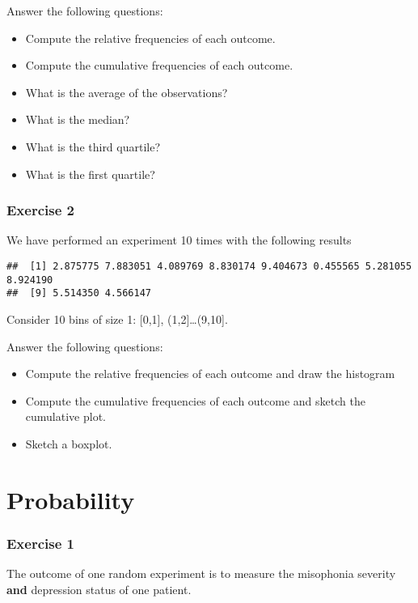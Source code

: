 \documentclass[
]{book}
\providecommand{\tightlist}{%
  \setlength{\itemsep}{0pt}\setlength{\parskip}{0pt}}
\begin{document}
Answer the following questions:

\begin{itemize}
\tightlist
\item
  Compute the relative frequencies of each outcome.
\item
  Compute the cumulative frequencies of each outcome.
\item
  What is the average of the observations?
\item
  What is the median?
\item
  What is the third quartile?
\item
  What is the first quartile?
\end{itemize}

\hypertarget{exercise-2}{%
\subsubsection{Exercise 2}\label{exercise-2}}

We have performed an experiment 10 times with the following results

\begin{verbatim}
##  [1] 2.875775 7.883051 4.089769 8.830174 9.404673 0.455565 5.281055 8.924190
##  [9] 5.514350 4.566147
\end{verbatim}

Consider 10 bins of size 1: {[}0,1{]}, (1,2{]}\ldots(9,10{]}.

Answer the following questions:

\begin{itemize}
\item
  Compute the relative frequencies of each outcome and draw the histogram
\item
  Compute the cumulative frequencies of each outcome and sketch the cumulative plot.
\item
  Sketch a boxplot.
\end{itemize}

\hypertarget{probability-3}{%
\section{Probability}\label{probability-3}}

\hypertarget{exercise-1-1}{%
\subsubsection{Exercise 1}\label{exercise-1-1}}

The outcome of one random experiment is to measure the misophonia severity \textbf{and} depression status of one patient.
\end{document}
